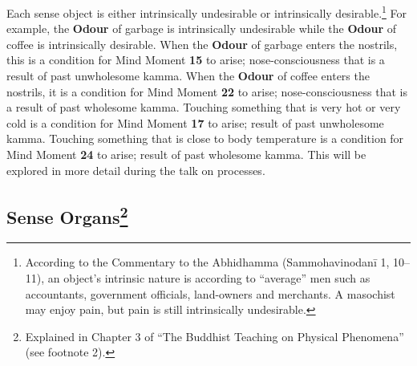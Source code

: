 Each sense object is either intrinsically undesirable or intrinsically desirable.\footnote{According to the Commentary to the Abhidhamma (Sammohavinodanī 1, 10--11), an object’s intrinsic nature is according to “average” men such as accountants, government officials, land-owners and merchants. A masochist may enjoy pain, but pain is still intrinsically undesirable.} For example, the \textbf{Odour} of garbage is intrinsically undesirable while the \textbf{Odour} of coffee is intrinsically desirable. When the \textbf{Odour} of garbage enters the nostrils, this is a condition for Mind Moment \textbf{15} to arise; nose-consciousness that is a result of past unwholesome kamma. When the \textbf{Odour} of coffee enters the nostrils, it is a condition for Mind Moment \textbf{22} to arise; nose-consciousness that is a result of past wholesome kamma. Touching something that is very hot or very cold is a condition for Mind Moment \textbf{17} to arise; result of past unwholesome kamma. Touching something that is close to body temperature is a condition for Mind Moment \textbf{24} to arise; result of past wholesome kamma. This will be explored in more detail during the talk on processes.

\subsection*{Sense Organs\footnote{Explained in Chapter 3 of “The Buddhist Teaching on Physical Phenomena” (see footnote 2).}}

